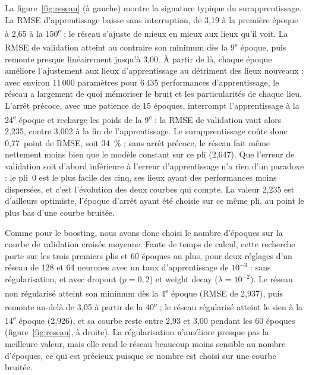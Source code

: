 \documentclass[11pt,a4paper]{article}
\begin{document}
La figure~\ref{fig:reseau} (à gauche) montre la signature typique du surapprentissage. La RMSE d'apprentissage baisse
sans interruption, de 3,19 à la première époque à 2,65 à la 150\textsuperscript{e} : le réseau s'ajuste de mieux en
mieux aux lieux qu'il voit. La RMSE de validation atteint au contraire son minimum dès la 9\textsuperscript{e} époque,
puis remonte presque linéairement jusqu'à 3,00. À partir de là, chaque époque améliore l'ajustement aux lieux
d'apprentissage au détriment des lieux nouveaux : avec environ 11\,000 paramètres pour 6\,435 performances
d'apprentissage, le réseau a largement de quoi mémoriser le bruit et les particularités de chaque lieu. L'arrêt précoce,
avec une patience de 15 époques, interrompt l'apprentissage à la 24\textsuperscript{e} époque et recharge les poids de
la 9\textsuperscript{e} : la RMSE de validation vaut alors 2,235, contre 3,002 à la fin de l'apprentissage. Le
surapprentissage coûte donc 0,77~point de RMSE, soit $34$~\% ; sans arrêt précoce, le réseau fait même nettement moins
bien que le modèle constant sur ce pli (2,647). Que l'erreur de validation soit d'abord inférieure à l'erreur
d'apprentissage n'a rien d'un paradoxe : le pli~0 est le plus facile des cinq, ses lieux ayant des performances moins
dispersées, et c'est l'évolution des deux courbes qui compte. La valeur 2,235 est d'ailleurs optimiste, l'époque
d'arrêt ayant été choisie sur ce même pli, au point le plus bas d'une courbe bruitée.

Comme pour le boosting, nous avons donc choisi le nombre d'époques sur la courbe de validation croisée moyenne. Faute
de temps de calcul, cette recherche porte sur les trois premiers plis et 60 époques au plus, pour deux réglages d'un
réseau de 128 et 64 neurones avec un taux d'apprentissage de $10^{-3}$ : sans régularisation, et avec dropout
($p = 0{,}2$) et weight decay ($\lambda = 10^{-2}$). Le réseau non régularisé atteint son minimum dès la
4\textsuperscript{e} époque (RMSE de 2,937), puis remonte au-delà de 3,05 à partir de la 40\textsuperscript{e} ; le
réseau régularisé atteint le sien à la 14\textsuperscript{e} époque (2,926), et sa courbe reste entre 2,93 et 3,00
pendant les 60 époques (figure~\ref{fig:reseau}, à droite). La régularisation n'améliore presque pas la meilleure
valeur, mais elle rend le réseau beaucoup moins sensible au nombre d'époques, ce qui est précieux puisque ce nombre
est choisi sur une courbe bruitée.
\end{document}
